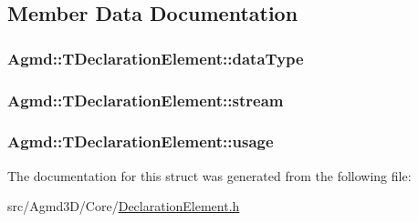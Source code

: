 \subsection{Member Data Documentation}
\hypertarget{struct_agmd_1_1_t_declaration_element_a75d2605927162664b379e891222ba3f5}{
\subsubsection[{data\+Type}]{ Agmd\+::\+T\+Declaration\+Element\+::data\+Type}}\label{struct_agmd_1_1_t_declaration_element_a75d2605927162664b379e891222ba3f5}
\hypertarget{struct_agmd_1_1_t_declaration_element_af9bd657add9402c475ea016ccf832b43}{
\subsubsection[{stream}]{ Agmd\+::\+T\+Declaration\+Element\+::stream}}\label{struct_agmd_1_1_t_declaration_element_af9bd657add9402c475ea016ccf832b43}
\hypertarget{struct_agmd_1_1_t_declaration_element_a326d7df0b2f1c094309e77de62e3fdaf}{
\subsubsection[{usage}]{ Agmd\+::\+T\+Declaration\+Element\+::usage}}\label{struct_agmd_1_1_t_declaration_element_a326d7df0b2f1c094309e77de62e3fdaf}


The documentation for this struct was generated from the following file\+:\begin{DoxyCompactItemize}
\item 
src/\+Agmd3\+D/\+Core/\hyperlink{_declaration_element_8h}{Declaration\+Element.\+h}\end{DoxyCompactItemize}
